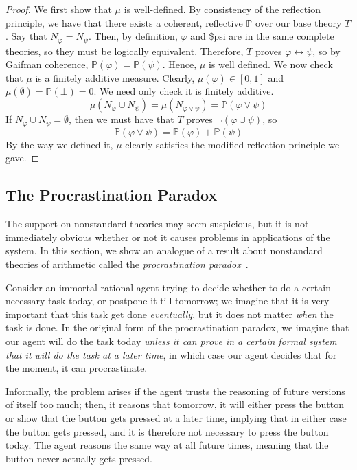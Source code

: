 \documentclass[12pt]{article}
\newcommand{\PP}{\mathbb{P}}
\newcommand{\vp}{\varphi}
\theoremstyle{plain}
\theoremstyle{definition}
\theoremstyle{remark}
\newif\ifprocrastinate
\begin{document}
\begin{proof}
We first show that $\mu$ is well-defined. By consistency of the reflection principle, we have that there exists a coherent, reflective $\PP$ over our base theory $T$.
Say that $N_{\vp}=N_{\psi}$. Then, by definition, $\vp$ and \$psi are in the same complete theories, so they must be logically equivalent. Therefore, $T$ proves $\vp\leftrightarrow\psi$, so by Gaifman coherence, $\PP(\vp)=\PP(\psi)$. Hence, $\mu$ is well defined.
We now check that $\mu$ is a finitely additive measure. Clearly, $\mu(\vp)\in[0,1]$ and $\mu(\emptyset)=\PP(\bot)=0$.
We need only check it is finitely additive. 
$$\mu(N_{\vp}\cup N_{\psi})=\mu(N_{\vp\vee\psi})=\PP(\vp\vee\psi)$$
If $N_{\vp}\cup N_{\psi}=\emptyset$, then we must have that $T$ proves $\neg(\vp\cup\psi)$, so 
$$\PP(\vp\vee\psi)=\PP(\vp)+\PP(\psi)$$
By the way we defined it, $\mu$ clearly satisfies the modified reflection principle we gave.
\end{proof}

\ifprocrastinate
\subsection{The Procrastination Paradox}
The support on nonstandard theories may seem suspicious, but it is not immediately obvious whether or not it causes problems in applications of the system. In this section, we show an analogue of a result about nonstandard theories of arithmetic called the \emph{procrastination paradox}~\cite{yudkowsky13}. 

Consider an immortal rational agent trying to decide whether to do a certain necessary task today, or postpone it till tomorrow; we imagine that it is very important that this task get done \emph{eventually}, but it does not matter \emph{when} the task is done. In the original form of the procrastination paradox, we imagine that our agent will do the task today \emph{unless it can prove in a certain formal system that it will do the task at a later time}, in which case our agent decides that for the moment, it can procrastinate.

Informally, the problem arises if the agent trusts the reasoning of future versions of itself too much; then, it reasons that tomorrow, it will either press the button or show that the button gets pressed at a later time, implying that in either case the button gets pressed, and it is therefore not necessary to press the button today. The agent reasons the same way at all future times, meaning that the button never actually gets pressed.
\end{document}
